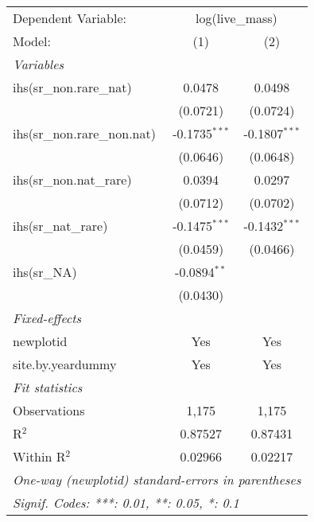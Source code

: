 \begin{tabular}{lcc}
\tabularnewline\midrule\midrule
Dependent Variable:&\multicolumn{2}{c}{log(live\_mass)}\\
Model:&(1) & (2)\\
\midrule \emph{Variables}&   &  \\
ihs(sr\_non.rare\_nat)&0.0478 & 0.0498\\
  &(0.0721) & (0.0724)\\
ihs(sr\_non.rare\_non.nat)&-0.1735$^{***}$ & -0.1807$^{***}$\\
  &(0.0646) & (0.0648)\\
ihs(sr\_non.nat\_rare)&0.0394 & 0.0297\\
  &(0.0712) & (0.0702)\\
ihs(sr\_nat\_rare)&-0.1475$^{***}$ & -0.1432$^{***}$\\
  &(0.0459) & (0.0466)\\
ihs(sr\_NA)&-0.0894$^{**}$ &   \\
  &(0.0430) &   \\
\midrule \emph{Fixed-effects}&   &  \\
newplotid & Yes & Yes\\
site.by.yeardummy & Yes & Yes\\
\midrule \emph{Fit statistics}&  & \\
Observations & 1,175&1,175\\
R$^2$ & 0.87527&0.87431\\
Within R$^2$ & 0.02966&0.02217\\
\midrule\midrule\multicolumn{3}{l}{\emph{One-way (newplotid) standard-errors in parentheses}}\\
\multicolumn{3}{l}{\emph{Signif. Codes: ***: 0.01, **: 0.05, *: 0.1}}\\
\end{tabular}


